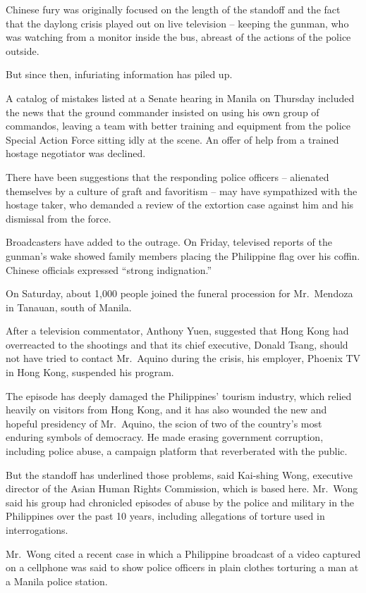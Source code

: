 ﻿\documentclass[12pt]{article}
\begin{document}
Chinese fury was originally focused on the length of the standoff and the fact that the daylong
crisis played out on live television -- keeping the gunman, who was watching from a monitor inside
the bus, abreast of the actions of the police outside.

But since then, infuriating information has piled up.

A catalog of mistakes listed at a Senate hearing in Manila on Thursday included the news that the
ground commander insisted on using his own group of commandos, leaving a team with better training
and equipment from the police Special Action Force sitting idly at the scene. An offer of help from
a trained hostage negotiator was declined.

There have been suggestions that the responding police officers -- alienated themselves by a culture
of graft and favoritism -- may have sympathized with the hostage taker, who demanded a review of the
extortion case against him and his dismissal from the force.

Broadcasters have added to the outrage. On Friday, televised reports of the gunman's wake showed
family members placing the Philippine flag over his coffin. Chinese officials expressed ``strong
indignation.''

On Saturday, about 1,000 people joined the funeral procession for Mr.~Mendoza in Tanauan, south of
Manila.

After a television commentator, Anthony Yuen, suggested that Hong Kong had overreacted to the
shootings and that its chief executive, Donald Tsang, should not have tried to contact Mr.~Aquino
during the crisis, his employer, Phoenix TV in Hong Kong, suspended his program.

The episode has deeply damaged the Philippines' tourism industry, which relied heavily on visitors
from Hong Kong, and it has also wounded the new and hopeful presidency of Mr.~Aquino, the scion of
two of the country's most enduring symbols of democracy. He made erasing government corruption,
including police abuse, a campaign platform that reverberated with the public.

But the standoff has underlined those problems, said Kai-shing Wong, executive director of the Asian
Human Rights Commission, which is based here. Mr.~Wong said his group had chronicled episodes of
abuse by the police and military in the Philippines over the past 10 years, including allegations of
torture used in interrogations.

Mr.~Wong cited a recent case in which a Philippine broadcast of a video captured on a cellphone was
said to show police officers in plain clothes torturing a man at a Manila police station.
\end{document}
